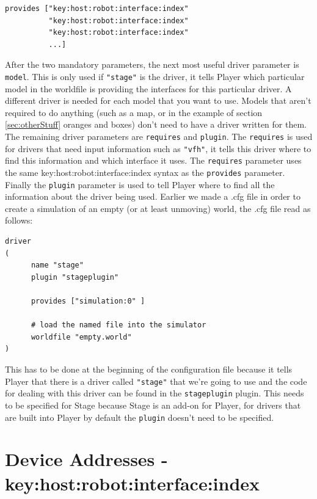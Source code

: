 \documentclass[a4paper]{report}
\newcommand{\pl}{Player\xspace}
\begin{document}
\begin{verbatim}
provides ["key:host:robot:interface:index" 
          "key:host:robot:interface:index"
          "key:host:robot:interface:index"
          ...]
\end{verbatim}

After the two mandatory parameters, the next most useful driver parameter is \verb|model|. This is only used if \verb|"stage"| is the driver, it tells \pl which particular model in the worldfile is providing the interfaces for this particular driver. A different driver is needed for each model that you want to use. Models that aren't required to do anything (such as a map, or in the example of section \ref{sec:otherStuff} oranges and boxes) don't need to have a driver written for them.\newline
The remaining driver parameters are \verb|requires| and \verb|plugin|. The \verb|requires| is used for drivers that need input information such as \verb|"vfh"|, it tells this driver where to find this information and which interface it uses. The \verb|requires| parameter uses the same key:host:robot:interface:index syntax as the \verb|provides| parameter. Finally the \verb|plugin| parameter is used to tell \pl where to find all the information about the driver being used. Earlier we made a .cfg file in order to create a simulation of an empty (or at least unmoving) world, the .cfg file read as follows:
\begin{verbatim}
driver
(		
      name "stage"
      plugin "stageplugin"

      provides ["simulation:0" ]

      # load the named file into the simulator
      worldfile "empty.world"	
)
\end{verbatim}
This has to be done at the beginning of the configuration file because it tells \pl that there is a driver called \verb|"stage"| that we're going to use and the code for dealing with this driver can be found in the \verb|stageplugin| plugin. This needs to be specified for Stage because Stage is an add-on for \pl, for drivers that are built into \pl by default the \verb|plugin| doesn't need to be specified.

\section{Device Addresses - key:host:robot:interface:index} \label{sec:deviceAddress}
\end{document}
